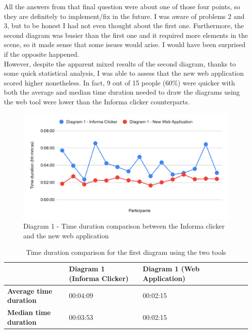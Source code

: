 \documentclass[]{usiinfbachelorproject}
\begin{document}
\noindent All the answers from that final question were about one of those four points, so they are definitely to implement/fix in the future. I was aware of problems 2 and 3, but to be honest I had not even thought about the first one. Furthermore, the second diagram was busier than the first one and it required more elements in the scene, so it made sense that some issues would arise. I would have been surprised if the opposite happened.\\
However, despite the apparent mixed results of the second diagram, thanks to some quick statistical analysis, I was able to assess that the new web application scored higher nonetheless. In fact, 9 out of 15 people (60\%) were quicker with both the average and median time duration needed to draw the diagrams using the web tool were lower than the Informa clicker counterparts. 

\begin{figure}[h!]
\centering
\includegraphics[scale=0.7]{figures/diagram1-time-comparison.png}
\caption {Diagram 1 - Time duration comparison between the Informa clicker and the new web application}
\end{figure}

\begin{table}[h!]
\centering
\begin{tabular}{|l|l|l|l|l|l|l|}
\hline
 & \textbf{Diagram 1 (Informa Clicker)} & \textbf{Diagram 1 (Web Application)} \\ \hline
\textbf{Average time duration} & 00:04:09 & 00:02:15 \\ \hline
\textbf{Median time duration} & 00:03:53 & 00:02:15 \\ \hline
\end{tabular}
\caption{Time duration comparison for the first diagram using the two tools}
\end{table}
\end{document}
